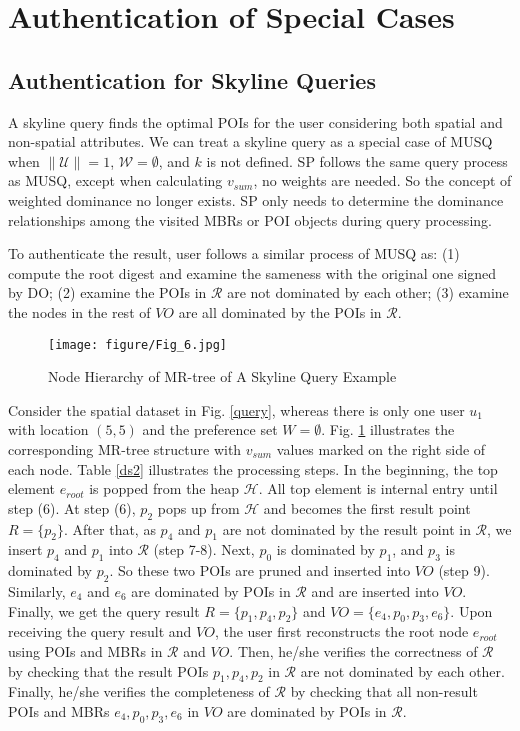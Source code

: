 \documentclass[10pt, conference, compsocconf]{IEEEtran}
\begin{document}
\section{Authentication of Special Cases}

\subsection{Authentication for Skyline Queries}

A skyline query finds the optimal POIs for the user considering both spatial and non-spatial attributes. We can treat a skyline query as a special case of MUSQ when $\|\mathcal{U}\|=1$, $\mathcal{W}=\emptyset$, and $k$ is not defined. SP follows the same query process as MUSQ, except when calculating $v_{sum}$, no weights are needed. So the concept of weighted dominance no longer exists. SP only needs to determine the dominance relationships among the visited MBRs or POI objects during query processing.

To authenticate the result, user follows a similar process of MUSQ as: (1) compute the root digest and examine the sameness with the original one signed by DO; (2) examine the POIs in $\mathcal{R}$ are not dominated by each other; (3) examine the nodes in the rest of $VO$ are all dominated by the POIs in $\mathcal{R}$.

\begin{figure}[htbp]
	\centering
	\texttt{[image: figure/Fig\_6.jpg]}
	\caption{Node Hierarchy of MR-tree of A Skyline Query Example}
	\label{examplesky}
\end{figure}

Consider the spatial dataset in Fig. \ref{query}, whereas there is only one user $u_1$ with location $(5,5)$ and the preference set $W = \emptyset$. Fig. \ref{examplesky} illustrates the corresponding MR-tree structure with $v_{sum}$ values marked on the right side of each node. Table \ref{ds2} illustrates the processing steps. In the beginning, the top element $e_{root}$ is popped from the heap $\mathcal{H}$. All top element is internal entry until step (6). At step (6), $p_2$ pops up from $\mathcal{H}$ and becomes the first result point $R =\{p_2\}$. After that, as $p_4$ and $p_1$ are not dominated by the result point in $\mathcal{R}$, we insert $p_4$ and $p_1$ into $\mathcal{R}$ (step 7-8). Next, $p_0$ is dominated by $p_1$, and $p_3$ is dominated by $p_2$. So these two POIs are pruned and inserted into $VO$ (step 9). Similarly, $e_4$ and $e_6$ are dominated by POIs in $\mathcal{R}$ and are inserted into $VO$. Finally, we get the query result $R= \{p_1,p_4,p_2\}$ and $VO = \{e_4,p_0,p_3,e_6\}$. Upon receiving the query result and $VO$, the user first reconstructs the root node $e_{root}$ using POIs and MBRs in $\mathcal{R}$ and $VO$. Then, he/she verifies the correctness of $\mathcal{R}$ by checking that the result POIs $p_1,p_4,p_2$ in $\mathcal{R}$ are not dominated by each other. Finally, he/she verifies the completeness of $\mathcal{R}$ by checking that all non-result POIs and MBRs $e_4,p_0,p_3,e_6$ in $VO$ are dominated by POIs in $\mathcal{R}$.
\end{document}
